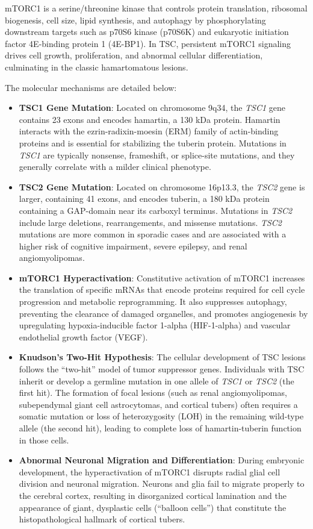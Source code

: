 mTORC1 is a serine/threonine kinase that controls protein translation, ribosomal biogenesis, cell size, lipid synthesis, and autophagy by phosphorylating downstream targets such as p70S6 kinase (p70S6K) and eukaryotic initiation factor 4E-binding protein 1 (4E-BP1). In TSC, persistent mTORC1 signaling drives cell growth, proliferation, and abnormal cellular differentiation, culminating in the classic hamartomatous lesions.

The molecular mechanisms are detailed below:
\begin{itemize}
    \item \textbf{TSC1 Gene Mutation}: Located on chromosome 9q34, the \textit{TSC1} gene contains 23 exons and encodes hamartin, a 130 kDa protein. Hamartin interacts with the ezrin-radixin-moesin (ERM) family of actin-binding proteins and is essential for stabilizing the tuberin protein. Mutations in \textit{TSC1} are typically nonsense, frameshift, or splice-site mutations, and they generally correlate with a milder clinical phenotype.
    \item \textbf{TSC2 Gene Mutation}: Located on chromosome 16p13.3, the \textit{TSC2} gene is larger, containing 41 exons, and encodes tuberin, a 180 kDa protein containing a GAP-domain near its carboxyl terminus. Mutations in \textit{TSC2} include large deletions, rearrangements, and missense mutations. \textit{TSC2} mutations are more common in sporadic cases and are associated with a higher risk of cognitive impairment, severe epilepsy, and renal angiomyolipomas.
    \item \textbf{mTORC1 Hyperactivation}: Constitutive activation of mTORC1 increases the translation of specific mRNAs that encode proteins required for cell cycle progression and metabolic reprogramming. It also suppresses autophagy, preventing the clearance of damaged organelles, and promotes angiogenesis by upregulating hypoxia-inducible factor 1-alpha (HIF-1-alpha) and vascular endothelial growth factor (VEGF).
    \item \textbf{Knudson's Two-Hit Hypothesis}: The cellular development of TSC lesions follows the ``two-hit'' model of tumor suppressor genes. Individuals with TSC inherit or develop a germline mutation in one allele of \textit{TSC1} or \textit{TSC2} (the first hit). The formation of focal lesions (such as renal angiomyolipomas, subependymal giant cell astrocytomas, and cortical tubers) often requires a somatic mutation or loss of heterozygosity (LOH) in the remaining wild-type allele (the second hit), leading to complete loss of hamartin-tuberin function in those cells.
    \item \textbf{Abnormal Neuronal Migration and Differentiation}: During embryonic development, the hyperactivation of mTORC1 disrupts radial glial cell division and neuronal migration. Neurons and glia fail to migrate properly to the cerebral cortex, resulting in disorganized cortical lamination and the appearance of giant, dysplastic cells (``balloon cells'') that constitute the histopathological hallmark of cortical tubers.
\end{itemize}

